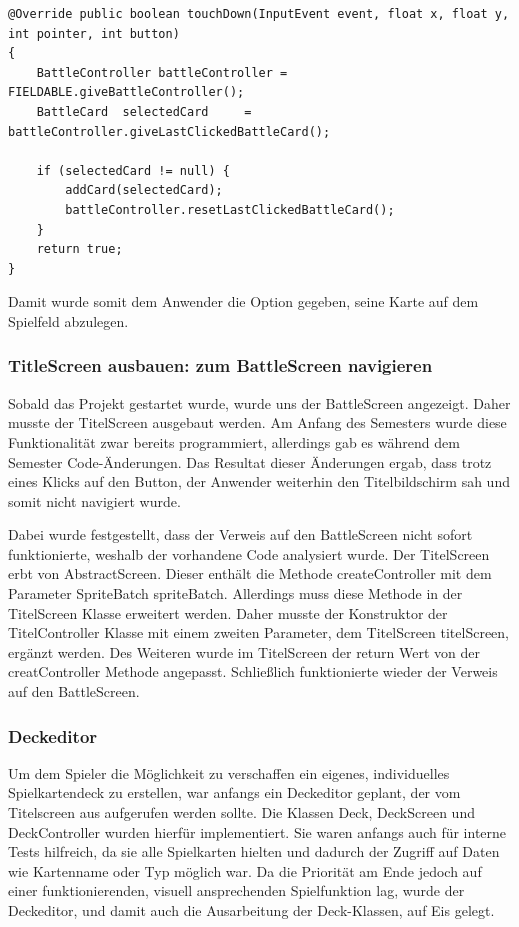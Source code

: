 \begin{lstlisting}
@Override public boolean touchDown(InputEvent event, float x, float y, int pointer, int button)
{
    BattleController battleController = FIELDABLE.giveBattleController();
    BattleCard  selectedCard     = battleController.giveLastClickedBattleCard();

    if (selectedCard != null) {
        addCard(selectedCard);
        battleController.resetLastClickedBattleCard();
    }
    return true;
}
\end{lstlisting}

Damit wurde somit dem Anwender die Option gegeben, seine Karte auf dem Spielfeld abzulegen. 

\subsubsection{TitleScreen ausbauen: zum BattleScreen navigieren}
Sobald das Projekt gestartet wurde, wurde uns der BattleScreen angezeigt. Daher musste der TitelScreen ausgebaut werden. Am Anfang des Semesters wurde diese Funktionalität zwar bereits programmiert, allerdings gab es während dem Semester Code-Änderungen. Das Resultat dieser Änderungen ergab, dass trotz eines Klicks auf den Button, der Anwender weiterhin den Titelbildschirm sah und somit nicht navigiert wurde. 

Dabei wurde festgestellt, dass der Verweis auf den BattleScreen nicht sofort funktionierte, weshalb der vorhandene Code analysiert wurde. Der TitelScreen erbt von AbstractScreen. Dieser enthält die Methode createController mit dem Parameter SpriteBatch spriteBatch. Allerdings muss diese Methode in der TitelScreen Klasse erweitert werden. Daher musste der Konstruktor der TitelController Klasse mit einem zweiten Parameter, dem TitelScreen titelScreen, ergänzt werden. Des Weiteren wurde im TitelScreen der return Wert von der creatController Methode angepasst. Schließlich funktionierte wieder der Verweis auf den BattleScreen. 

\subsubsection{Deckeditor}
Um dem Spieler die Möglichkeit zu verschaffen ein eigenes, individuelles Spielkartendeck zu erstellen, war anfangs ein Deckeditor geplant, der vom Titelscreen aus aufgerufen werden sollte. Die Klassen Deck, DeckScreen und DeckController wurden hierfür implementiert. Sie waren anfangs auch für interne Tests hilfreich, da sie alle Spielkarten hielten und dadurch der Zugriff auf Daten wie Kartenname oder Typ möglich war. Da die Priorität am Ende jedoch auf einer funktionierenden, visuell ansprechenden Spielfunktion lag, wurde der Deckeditor, und damit auch die Ausarbeitung der Deck-Klassen, auf Eis gelegt.

